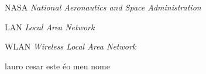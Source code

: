 \begin{siglas} \itemsep -1pt
	\item[NASA] \hspace{.8cm} \textit{National Aeronautics and Space Administration}
	\item[LAN] \hspace{.8cm} \textit{Local Area Network}
	\item[WLAN] \hspace{.8cm} \textit{Wireless Local Area Network}
	\item[lauro cesar] \hspace{1cm} este éo meu nome
\end{siglas}